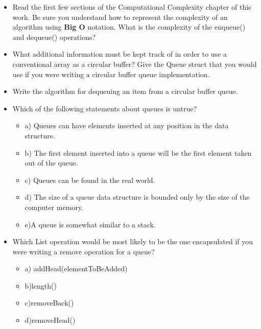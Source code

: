 \begin{itemize}
\item Read the first few sections of the Computational Complexity chapter of this work.  Be sure you understand how to represent the complexity of an algorithm using \textbf{Big O} notation.     What is the complexity of the enqueue() and dequeue() operations?

\item What additional information must be kept track of in order to use a 
       conventional array as a circular buffer?  Give the Queue struct that you would use if you were writing a circular buffer queue implementation.

\item Write the algorithm for dequeuing an item from a circular buffer queue.

\item Which of the following statements about queues is untrue?

\begin{itemize}
\item a) Queues can have elements inserted at any position in the data 
       structure.

\item b) The first element inserted into a queue will be the first element 
       taken out of the queue.

\item c) Queues can be found in the real world.

\item d) The size of a queue data structure is bounded only by the size of the 
       computer memory.

\item e)A queue is somewhat similar to a stack.

\end{itemize}

\item Which List operation would be most likely to be the one encapsulated if you were writing a remove operation for a queue?
\begin{itemize}
\item a) addHead(elementToBeAdded)

\item b)length()

\item c)removeBack()

\item d)removeHead()


\end{itemize}
\end{itemize}
